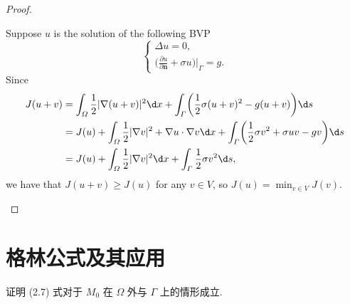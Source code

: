\begin{proof}
\begin{description}
      Suppose $u$ is the solution of the following BVP
      \[\begin{cases}
        \Delta u = 0, \\
        \bigl(\frac{\partial u}{\partial \bm{n}} + \sigma u\bigr)\big|_{\varGamma} = g.
      \end{cases}\]
      Since
      \begin{equation}\label{eq:e12}
        \begin{aligned}
          J(u+v)
          & = \int_\varOmega \frac12 |\nabla(u+v)|^2 \d x
              + \int_\varGamma \biggl(\frac12 \sigma (u+v)^2 - g(u+v)\biggr) \d s \\
          & = J(u) + \int_\varOmega \frac12 |\nabla v|^2 + \nabla u\cdot\nabla v \d x
              + \int_\varGamma \biggl(\frac12 \sigma v^2 + \sigma uv - gv\biggr) \d s \\
          & = J(u) + \int_\varOmega \frac12 |\nabla v|^2 \d x
              + \int_\varGamma \frac12 \sigma v^2 \d s,
        \end{aligned}
      \end{equation}
      we have that $J(u+v)\geq J(u)$ for any $v\in V$, so $J(u) = \min_{v\in V} J(v)$. \qedhere
  \end{description}
\end{proof}



\section{格林公式及其应用}

\begin{exercise}
  证明 (2.7) 式对于 $M_0$ 在 $\varOmega$ 外与 $\varGamma$ 上的情形成立.
\end{exercise}

